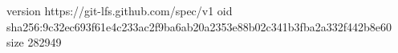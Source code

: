 version https://git-lfs.github.com/spec/v1
oid sha256:9c32ec693f61e4c233ac2f9ba6ab20a2353e88b02c341b3fba2a332f442b8e60
size 282949
